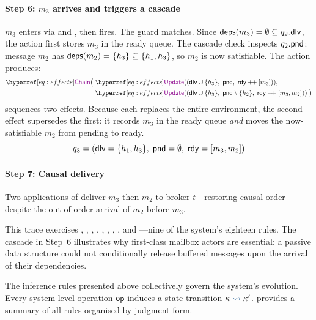 \documentclass[
  a4paper,        %
  techreport,     %
]{art}
\begin{document}
\paragraph{Step 6: $m_3$ arrives and triggers a cascade}
$m_3$ enters via  and , then
 fires. The guard matches. Since $\mathsf{deps}(m_3) =
\emptyset \subseteq q_2.\mathsf{dlv}$, the action first stores $m_3$ in the
ready queue. The cascade check inspects
$q_2.\mathsf{pnd}$: message $m_2$ has $\mathsf{deps}(m_2) = \{h_3\}
\subseteq \{h_1, h_3\}$, so $m_2$ is now satisfiable. The action produces:
\begin{align*}
  \refeffect{Chain}\bigl(\;
    &\update{(\fdlv \cup \{h_3\},\;
             \fpnd,\;
             \frdy \pp [m_3])},\\
    &\update{(\fdlv \cup \{h_3\},\;
             \fpnd \setminus \{h_2\},\;
             \frdy \pp [m_3, m_2])}\;\bigr)
\end{align*}
 sequences two  effects. Because each
 replaces the entire environment, the second effect
supersedes the first: it records $m_3$ in the ready queue \emph{and}
moves the now-satisfiable $m_2$ from pending to ready.
\[
  q_3 = (\mathsf{dlv} = \{h_1, h_3\},\;
         \mathsf{pnd} = \emptyset,\;
         \mathsf{rdy} = [m_3, m_2])
\]

\paragraph{Step 7: Causal delivery}
Two applications of  deliver $m_3$ then $m_2$ to broker
$t$---restoring causal order despite the out-of-order arrival of $m_2$ before
$m_3$.

\medskip\noindent
This trace exercises , , ,
, , ,
,
, and ---nine of the system's eighteen rules.
The cascade in Step~6 illustrates why first-class mailbox actors are
essential: a passive data structure could not conditionally release buffered
messages upon the arrival of their dependencies.

The inference rules presented above collectively govern the system's
evolution. Every system-level operation $\mathsf{op}$ induces a state
transition $\sysstep{\SystemState}{\SystemState'}$.
 provides a summary of all rules organised
by judgment form.
\end{document}
